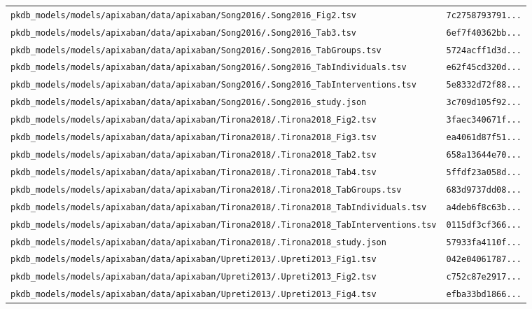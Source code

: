 \documentclass{article}
\begin{document}
\begin{longtable}{ll}
\texttt{pkdb\_models/models/apixaban/data/apixaban/Song2016/.Song2016\_Fig2.tsv} & \texttt{7c2758793791...} \\
\texttt{pkdb\_models/models/apixaban/data/apixaban/Song2016/.Song2016\_Tab3.tsv} & \texttt{6ef7f40362bb...} \\
\texttt{pkdb\_models/models/apixaban/data/apixaban/Song2016/.Song2016\_TabGroups.tsv} & \texttt{5724acff1d3d...} \\
\texttt{pkdb\_models/models/apixaban/data/apixaban/Song2016/.Song2016\_TabIndividuals.tsv} & \texttt{e62f45cd320d...} \\
\texttt{pkdb\_models/models/apixaban/data/apixaban/Song2016/.Song2016\_TabInterventions.tsv} & \texttt{5e8332d72f88...} \\
\texttt{pkdb\_models/models/apixaban/data/apixaban/Song2016/.Song2016\_study.json} & \texttt{3c709d105f92...} \\
\texttt{pkdb\_models/models/apixaban/data/apixaban/Tirona2018/.Tirona2018\_Fig2.tsv} & \texttt{3faec340671f...} \\
\texttt{pkdb\_models/models/apixaban/data/apixaban/Tirona2018/.Tirona2018\_Fig3.tsv} & \texttt{ea4061d87f51...} \\
\texttt{pkdb\_models/models/apixaban/data/apixaban/Tirona2018/.Tirona2018\_Tab2.tsv} & \texttt{658a13644e70...} \\
\texttt{pkdb\_models/models/apixaban/data/apixaban/Tirona2018/.Tirona2018\_Tab4.tsv} & \texttt{5ffdf23a058d...} \\
\texttt{pkdb\_models/models/apixaban/data/apixaban/Tirona2018/.Tirona2018\_TabGroups.tsv} & \texttt{683d9737dd08...} \\
\texttt{pkdb\_models/models/apixaban/data/apixaban/Tirona2018/.Tirona2018\_TabIndividuals.tsv} & \texttt{a4deb6f8c63b...} \\
\texttt{pkdb\_models/models/apixaban/data/apixaban/Tirona2018/.Tirona2018\_TabInterventions.tsv} & \texttt{0115df3cf366...} \\
\texttt{pkdb\_models/models/apixaban/data/apixaban/Tirona2018/.Tirona2018\_study.json} & \texttt{57933fa4110f...} \\
\texttt{pkdb\_models/models/apixaban/data/apixaban/Upreti2013/.Upreti2013\_Fig1.tsv} & \texttt{042e04061787...} \\
\texttt{pkdb\_models/models/apixaban/data/apixaban/Upreti2013/.Upreti2013\_Fig2.tsv} & \texttt{c752c87e2917...} \\
\texttt{pkdb\_models/models/apixaban/data/apixaban/Upreti2013/.Upreti2013\_Fig4.tsv} & \texttt{efba33bd1866...} \\

\end{longtable}
\end{document}
